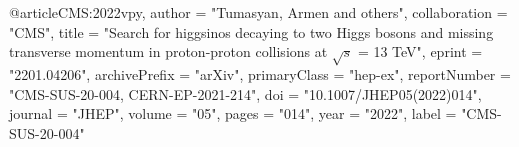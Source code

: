 @article{CMS:2022vpy,
    author = "Tumasyan, Armen and others",
    collaboration = "CMS",
    title = "{Search for higgsinos decaying to two Higgs bosons and missing transverse momentum in proton-proton collisions at $ \sqrt{s} $ = 13 TeV}",
    eprint = "2201.04206",
    archivePrefix = "arXiv",
    primaryClass = "hep-ex",
    reportNumber = "CMS-SUS-20-004, CERN-EP-2021-214",
    doi = "10.1007/JHEP05(2022)014",
    journal = "JHEP",
    volume = "05",
    pages = "014",
    year = "2022",
    label = "CMS-SUS-20-004"
}

